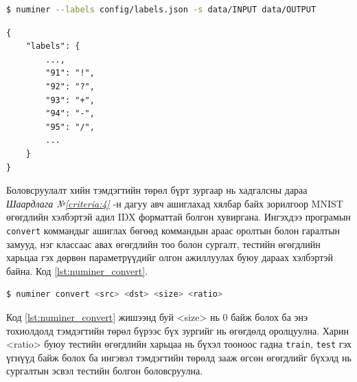 \begin{lstlisting}[caption={NUMiner --- config хавтас доторх labels.json нэртэй файлаас тэмдэгтийн түлхүүрүүдийг ямар дугаартай харгалзуулан хадгалахыг уншиж, data/INPUT доторх маягтуудыг боловсруулан үр дүнг data/OUTPUT дотор хадгал}, label={lst:numiner_labels}, language=bash, numbers=none]
$ numiner --labels config/labels.json -s data/INPUT data/OUTPUT
\end{lstlisting}

\begin{lstlisting}[caption={NUMiner --- labels.json}, label={lst:numiner_label_sample}]
{
	"labels": {
		...,
		"91": "!",
		"92": "?",
		"93": "+",
		"94": "-",
		"95": "/",
		...
	}
}
\end{lstlisting}

Боловсруулалт хийн тэмдэгтийн төрөл бүрт зургаар нь хадгалсны дараа \textit{Шаардлага №\ref{criteria:4}} -н дагуу авч ашиглахад хялбар байх зорилгоор MNIST \cite{mnist} өгөгдлийн хэлбэртэй адил IDX форматтай болгон хувиргана. Ингэхдээ програмын \texttt{convert} коммандыг ашиглах бөгөөд коммандын араас оролтын болон гаралтын замууд, нэг классаас авах өгөгдлийн тоо болон сургалт, тестийн өгөгдлийн харьцаа гэх дөрвөн параметрүүдийг олгон ажиллуулах буюу дараах хэлбэртэй байна. Код \ref{lst:numiner_convert}.

\begin{lstlisting}[caption={NUMiner convert --- <src> доторх тэмдэгтийн төрөл бүрээс <size> ширхэг зургийг авах ба нийт өгөгдлөөс <ratio> хувийг нь (хэрэв ratio бүхэл тоо бол нийт өгөгдлөөс салган авах тестийн өгөгдлийн хувь, train бол бүхэлдээ сургалтын, test бол бүхэлдээ тестийн өгөгдөл гэж тус тус үзнэ)  тестийн өгөгдөлд зориулан боловсруулж <dst> -д хадгална.}, label={lst:numiner_convert}, language=bash, numbers=none]
$ numiner convert <src> <dst> <size> <ratio>
\end{lstlisting}

Код \ref{lst:numiner_convert} жишээнд буй <size> нь 0 байж болох ба энэ тохиолдолд тэмдэгтийн төрөл бүрээс бүх зургийг нь өгөгдөлд оролцуулна. Харин <ratio> буюу тестийн өгөгдлийн харьцаа нь бүхэл тооноос гадна \texttt{train}, \texttt{test} гэх үгнүүд байж болох ба ингэвэл тэмдэгтийн төрөлд зааж өгсөн өгөгдлийг бүхэлд нь сургалтын эсвэл тестийн болгон боловсруулна.